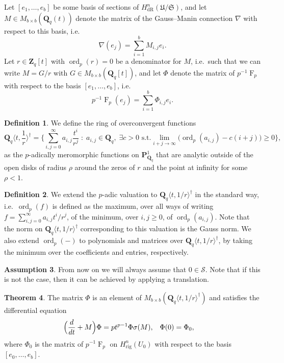 \documentclass[a4paper,11pt]{article}
\numberwithin{equation}{section}
\newcommand{\ZZ}{\mathbf{Z}} %
\newcommand{\QQ}{\mathbf{Q}} %
\DeclareMathOperator{\ord}{ord}          %
\DeclareMathOperator{\Frob}{F}           %
\providecommand{\HdR}{H_{\text{dR}}}    %
\providecommand{\Hrig}{H_{\text{rig}}}  %
\theoremstyle{definition}
\newtheorem{thm}{Theorem}[section]
\newtheorem{defn}[thm]{Definition}
\newtheorem{assump}[thm]{Assumption}
\begin{document}
Let $[e_1, \dotsc, e_b]$ be some basis of sections of 
$\HdR^n(\mathfrak{U}/\mathfrak{S})$, and let $M \in M_{b \times b}(\QQ_q(t))$ 
denote the matrix of the Gauss--Manin connection $\nabla$ with respect 
to this basis, i.e.
\[
\nabla (e_j) = \sum_{i=1}^b M_{i,j} e_i.
\]
Let $r \in \ZZ_q[t]$ with $\ord_p(r)=0$ be a denominator for $M$, i.e.\ such that we can write 
$M = G/r$ with $G \in M_{b \times b}(\QQ_q[t])$, and let $\Phi$ denote the 
matrix of $p^{-1}\Frob_p$ with respect to the basis $[e_1, \dotsc, e_b]$, i.e.\
\[
p^{-1} \Frob_p (e_j) = \sum_{i=1}^b \Phi_{i,j} e_i.
\]

\begin{defn}
We define the ring of overconvergent functions
\[
\QQ_q \langle t, \frac{1}{r} \rangle^{\dag} = 
\biggl\{\sum_{i,j=0}^{\infty} a_{i,j} \frac{t^i}{r^j} \; : \; 
a_{i,j} \in \QQ_q, \; \exists c > 0 \text{ s.t.}  
\lim_{i+j \rightarrow \infty} \bigl(\ord_p(a_{i,j}) - c(i+j)\bigr) \geq 0
\biggr\},
\]
as the $p$-adically meromorphic functions on $\mathbf{P}^1_{\QQ_q}$ that are 
analytic outside of the open disks of radius $\rho$ around the zeros of $r$ 
and the point at infinity for some $\rho<1$. 
\end{defn}

\begin{defn}
We extend the $p$-adic valuation 
to $\QQ_q \langle t, 1/r \rangle^{\dag}$ in the standard way, i.e.\ 
$\ord_p(f)$ is defined as the maximum, over all ways of writing 
$f = \sum_{i,j=0}^{\infty} a_{i,j} t^i / r^j$,
of the minimum, over $i,j \geq 0$, of $\ord_p(a_{i,j})$. Note that the  
norm on $\QQ_q \langle t, 1/r \rangle^{\dag}$ corresponding to this valuation
is the Gauss norm. We also extend $\ord_p(-)$ to polynomials and matrices over 
$\QQ_q \langle t, 1/r \rangle^{\dag}$, by taking the 
minimum over the coefficients and entries, respectively.
\end{defn}

\begin{assump} \label{assump:S}
From now on we will always assume that $0 \in \mathcal{S}$. 
Note that if this is not the case, then it can be achieved by 
applying a translation.
\end{assump}

\begin{thm} \label{thm:eqphi} 
The matrix $\Phi$ is an element of 
$M_{b \times b}(\QQ_q \langle t, 1/r \rangle^{\dag})$ 
and satisfies the differential equation
\begin{align*}
\Bigl(\frac{d}{dt} + M\Bigr) \Phi &= p t^{p-1} \Phi \sigma(M), &\Phi(0)& = \Phi_0,
\end{align*}
where $\Phi_0$ is the 
matrix of $p^{-1}\Frob_p$ on $\Hrig^n(U_0)$ with respect to the 
basis $[e_0,\dotsc,e_b]$.
\end{thm}
\end{document}
